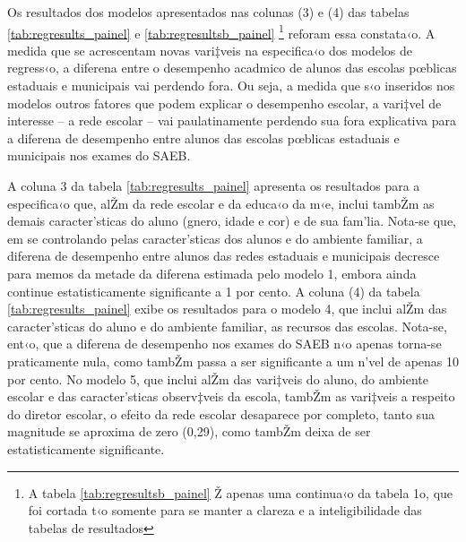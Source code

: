 \documentclass[a4paper, 12pt]{article}
\begin{document}
Os resultados dos modelos apresentados nas colunas (3) e (4)  das tabelas \ref{tab:regresults_painel} e \ref{tab:regresultsb_painel} \footnote{A tabela \ref{tab:regresultsb_painel}  Ž apenas uma continua‹o da tabela 1o, que foi cortada t‹o somente para se manter a clareza e a inteligibilidade das tabelas de resultados} reforam essa constata‹o. A medida que se acrescentam novas vari‡veis na especifica‹o dos modelos de regress‹o, a diferena entre o desempenho acadmico de alunos das escolas pœblicas estaduais e municipais vai perdendo fora. Ou seja, a medida que s‹o inseridos nos modelos outros fatores que podem explicar o desempenho escolar, a vari‡vel de interesse -- a rede escolar -- vai paulatinamente perdendo sua fora explicativa para a diferena de desempenho entre alunos das escolas pœblicas estaduais e municipais nos exames do SAEB.

A coluna 3 da tabela \ref{tab:regresults_painel} apresenta os resultados para a especifica‹o que, alŽm da rede escolar e da educa‹o da m‹e, inclui tambŽm as demais caracter’sticas do aluno (gnero, idade e cor) e de sua fam’lia. Nota-se que, em se controlando pelas caracter’sticas dos alunos e do ambiente familiar, a diferena de desempenho entre alunos das redes estaduais e municipais decresce para memos da metade da diferena estimada pelo modelo 1, embora ainda continue estatisticamente significante a 1 por cento. A coluna (4) da tabela \ref{tab:regresults_painel} exibe os resultados para o modelo 4, que inclui alŽm das caracter’sticas do aluno e do ambiente familiar, as recursos das escolas. Nota-se, ent‹o, que a diferena de desempenho nos exames do SAEB n‹o apenas torna-se praticamente nula, como tambŽm passa a ser significante a um n’vel de apenas 10 por cento. No modelo 5, que inclui alŽm das vari‡veis do aluno, do ambiente escolar e das caracter’sticas observ‡veis da escola, tambŽm as vari‡veis a respeito do diretor escolar, o efeito da rede escolar desaparece por completo, tanto sua magnitude se aproxima de zero (0,29), como tambŽm deixa de ser estatisticamente significante.  
\end{document}
